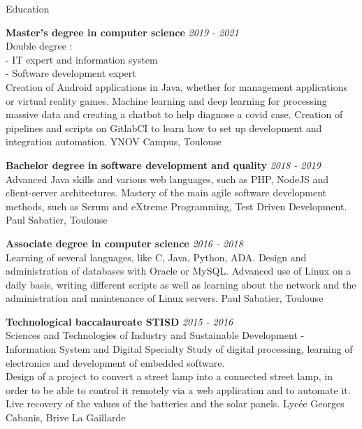 \documentclass[
	11pt, %
]{resume}
\begin{document}
\begin{rSection}{Education}
	
	\textbf{Master’s degree in computer science} \hfill \textit{2019 - 2021} \\ 
	Double degree : \\
	- IT expert and information system \\
	- Software development expert \\
	Creation of Android applications in Java, whether for management applications or virtual reality games. 
	Machine learning and deep learning for processing massive data and creating a chatbot to help diagnose a covid case.
	Creation of pipelines and scripts on GitlabCI to learn how to set up development and integration automation.
	\hfill { YNOV Campus, Toulouse }


	\textbf{Bachelor degree in software development and quality} \hfill {\em 2018 - 2019} \\ 
	Advanced Java skills and various web languages, such as PHP, NodeJS and client-server architectures. 
	Mastery of the main agile software development methods, such as Scrum and eXtreme Programming, Test Driven Development.
	\hfill { Paul Sabatier, Toulouse }


	\textbf{Associate degree in computer science} \hfill {\em 2016 - 2018} \\
	Learning of several languages, like C, Java, Python, ADA. Design and administration of databases with Oracle or MySQL. 
	Advanced use of Linux on a daily basis, writing different scripts as well as learning about the network and the administration and maintenance of Linux servers.
	\hfill { Paul Sabatier, Toulouse }

	\textbf{Technological baccalaureate STISD} \hfill {\em 2015 - 2016} \\ 
	Sciences and Technologies of Industry and Sustainable Development - 
	Information System and Digital Specialty Study of digital processing, learning of electronics and development of embedded software. \\ 
	Design of a project to convert a street lamp into a connected street lamp, in order to be able to control it remotely via a web application and to automate it. 
	Live recovery of the values of the batteries and the solar panels.
	\hfill { Lycée Georges Cabanis, Brive La Gaillarde }

\end{rSection}

\end{document}
